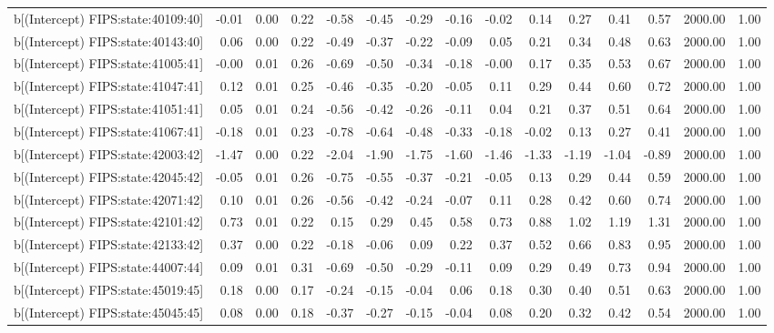 \begin{table}[ht]
\begin{tabular}{rrrrrrrrrrrrrrr}
  b[(Intercept) FIPS:state:40109:40] & -0.01 & 0.00 & 0.22 & -0.58 & -0.45 & -0.29 & -0.16 & -0.02 & 0.14 & 0.27 & 0.41 & 0.57 & 2000.00 & 1.00 \\ 
  b[(Intercept) FIPS:state:40143:40] & 0.06 & 0.00 & 0.22 & -0.49 & -0.37 & -0.22 & -0.09 & 0.05 & 0.21 & 0.34 & 0.48 & 0.63 & 2000.00 & 1.00 \\ 
  b[(Intercept) FIPS:state:41005:41] & -0.00 & 0.01 & 0.26 & -0.69 & -0.50 & -0.34 & -0.18 & -0.00 & 0.17 & 0.35 & 0.53 & 0.67 & 2000.00 & 1.00 \\ 
  b[(Intercept) FIPS:state:41047:41] & 0.12 & 0.01 & 0.25 & -0.46 & -0.35 & -0.20 & -0.05 & 0.11 & 0.29 & 0.44 & 0.60 & 0.72 & 2000.00 & 1.00 \\ 
  b[(Intercept) FIPS:state:41051:41] & 0.05 & 0.01 & 0.24 & -0.56 & -0.42 & -0.26 & -0.11 & 0.04 & 0.21 & 0.37 & 0.51 & 0.64 & 2000.00 & 1.00 \\ 
  b[(Intercept) FIPS:state:41067:41] & -0.18 & 0.01 & 0.23 & -0.78 & -0.64 & -0.48 & -0.33 & -0.18 & -0.02 & 0.13 & 0.27 & 0.41 & 2000.00 & 1.00 \\ 
  b[(Intercept) FIPS:state:42003:42] & -1.47 & 0.00 & 0.22 & -2.04 & -1.90 & -1.75 & -1.60 & -1.46 & -1.33 & -1.19 & -1.04 & -0.89 & 2000.00 & 1.00 \\ 
  b[(Intercept) FIPS:state:42045:42] & -0.05 & 0.01 & 0.26 & -0.75 & -0.55 & -0.37 & -0.21 & -0.05 & 0.13 & 0.29 & 0.44 & 0.59 & 2000.00 & 1.00 \\ 
  b[(Intercept) FIPS:state:42071:42] & 0.10 & 0.01 & 0.26 & -0.56 & -0.42 & -0.24 & -0.07 & 0.11 & 0.28 & 0.42 & 0.60 & 0.74 & 2000.00 & 1.00 \\ 
  b[(Intercept) FIPS:state:42101:42] & 0.73 & 0.01 & 0.22 & 0.15 & 0.29 & 0.45 & 0.58 & 0.73 & 0.88 & 1.02 & 1.19 & 1.31 & 2000.00 & 1.00 \\ 
  b[(Intercept) FIPS:state:42133:42] & 0.37 & 0.00 & 0.22 & -0.18 & -0.06 & 0.09 & 0.22 & 0.37 & 0.52 & 0.66 & 0.83 & 0.95 & 2000.00 & 1.00 \\ 
  b[(Intercept) FIPS:state:44007:44] & 0.09 & 0.01 & 0.31 & -0.69 & -0.50 & -0.29 & -0.11 & 0.09 & 0.29 & 0.49 & 0.73 & 0.94 & 2000.00 & 1.00 \\ 
  b[(Intercept) FIPS:state:45019:45] & 0.18 & 0.00 & 0.17 & -0.24 & -0.15 & -0.04 & 0.06 & 0.18 & 0.30 & 0.40 & 0.51 & 0.63 & 2000.00 & 1.00 \\ 
  b[(Intercept) FIPS:state:45045:45] & 0.08 & 0.00 & 0.18 & -0.37 & -0.27 & -0.15 & -0.04 & 0.08 & 0.20 & 0.32 & 0.42 & 0.54 & 2000.00 & 1.00 \\ 

\end{tabular}
\end{table}
